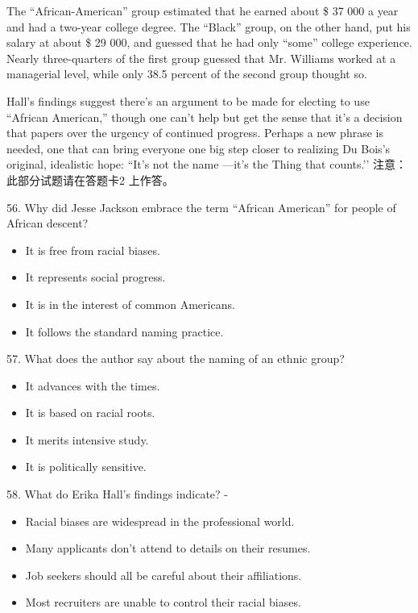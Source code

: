 \documentclass[UTF8,11pt]{ctexart}
\begin{document}
The “African-American” group estimated that he earned about \$ 37 000 a year and had a two-year college degree. The “Black” group, on the other hand, put his salary at about \$ 29 000, and guessed that he had only “some” college experience. Nearly three-quarters of the first group guessed that Mr. Williams worked at a managerial level, while only 38.5 percent of the second group thought so.


Hall’s findings suggest there’s an argument to be made for electing to use “African American,” though one can’t help but get the sense that it’s a decision that papers over the urgency of continued progress. Perhaps a new phrase is needed, one that can bring everyone one big step closer to realizing Du Bois’s original, idealistic hope: “It’s not the name —it’s the Thing that counts.’’ 注意：此部分试题请在答题卡2 上作答。


56. Why did Jesse Jackson embrace the term “African American” for people of African descent?


\begin{itemize}[leftmargin=2em,itemsep=.2em,topsep=.4em]\item[A.] It is free from racial biases.
\item[B.] It represents social progress.
\item[C.] It is in the interest of common Americans.
\item[D.] It follows the standard naming practice.
\end{itemize}

57. What does the author say about the naming of an ethnic group?


\begin{itemize}[leftmargin=2em,itemsep=.2em,topsep=.4em]\item[A.] It advances with the times.
\item[B.] It is based on racial roots.
\item[C.] It merits intensive study.
\item[D.] It is politically sensitive.
\end{itemize}

58. What do Erika Hall’s findings indicate? -


\begin{itemize}[leftmargin=2em,itemsep=.2em,topsep=.4em]\item[A.] Racial biases are widespread in the professional world.
\item[B.] Many applicants don’t attend to details on their resumes.
\item[C.] Job seekers should all be careful about their affiliations.
\item[D.] Most recruiters are unable to control their racial biases.
\end{itemize}
\end{document}
